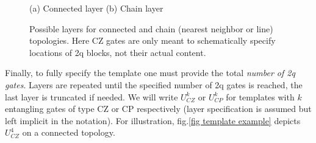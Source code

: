 \documentclass[twocolumn, amsfonts, amssymb, aps, nofootinbib]{revtex4-2}
\newcommand{\CZ}{CZ }
\newcommand{\CP}{CP }
\begin{document}
\begin{figure}
(a)	Connected layer \qquad\qquad(b) Chain layer
\\
\qquad\qquad
{}
\caption{Possible layers for connected and chain (nearest neighbor or line) topologies. Here \CZ gates are only meant to schematically specify locations of 2q blocks, not their actual content. }
\label{fig layers}
\end{figure}

Finally, to fully specify the template one must provide the total \textit{number of 2q gates}. Layers are repeated until the specified number of 2q gates is reached, the last layer is truncated if needed. We will write $U^k_{CZ}$ or $U^k_{CP}$ for templates with $k$ entangling gates of type \CZ or \CP respectively (layer specification is assumed but left implicit in the notation). For illustration, fig.\ref{fig template example} depicts $U^4_{CZ}$ on a connected topology.
\end{document}
